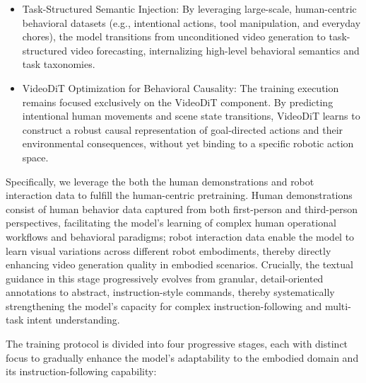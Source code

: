 \documentclass{llmxive}
\begin{document}
\begin{itemize}
    \item Task-Structured Semantic Injection: By leveraging large-scale, human-centric behavioral datasets (e.g., intentional actions, tool manipulation, and everyday chores), the model transitions from unconditioned video generation to task-structured video forecasting, internalizing high-level behavioral semantics and task taxonomies.

\item VideoDiT Optimization for Behavioral Causality: The training execution remains focused exclusively on the VideoDiT component. By predicting intentional human movements and scene state transitions, VideoDiT learns to construct a robust causal representation of goal-directed actions and their environmental consequences, without yet binding to a specific robotic action space.
\end{itemize}

Specifically, we leverage the both the human demonstrations and robot interaction data to fulfill the human-centric pretraining. Human demonstrations consist of human behavior data captured from both first-person and third-person perspectives, facilitating the model's learning of complex human operational workflows and behavioral paradigms; robot interaction data enable the model to learn visual variations across different robot embodiments, thereby directly enhancing video generation quality in embodied scenarios. Crucially, the textual guidance in this stage progressively evolves from granular, detail-oriented annotations to abstract, instruction-style commands, thereby systematically strengthening the model's capacity for complex instruction-following and multi-task intent understanding.


The training protocol is divided into four progressive stages, each with distinct focus to gradually enhance the model’s adaptability to the embodied domain and its instruction-following capability:
\end{document}
